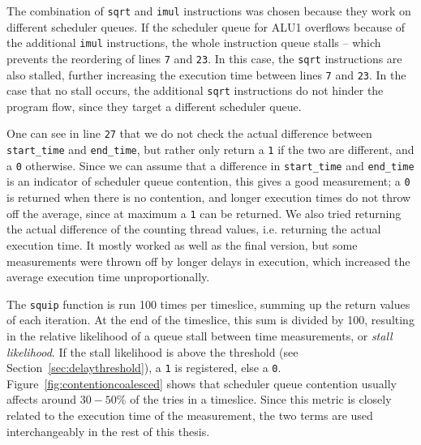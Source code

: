 \documentclass[11pt,
  titlepage=false,
]{scrreprt}
\begin{document}
The combination of \texttt{sqrt} and \texttt{imul} instructions was chosen because they work on different scheduler queues.
If the scheduler queue for ALU1 overflows because of the additional \texttt{imul} instructions,
the whole instruction queue stalls -- which prevents the reordering of lines \texttt{7} and \texttt{23}.
In this case, the \texttt{sqrt} instructions are also stalled, further increasing the execution time between lines \texttt{7} and \texttt{23}.
In the case that no stall occurs, the additional \texttt{sqrt} instructions do not hinder the program flow,
since they target a different scheduler queue.

One can see in line \texttt{27} that we do not check the actual difference between \texttt{start\_time} and \texttt{end\_time},
but rather only return a \texttt{1} if the two are different, and a \texttt{0} otherwise.
Since we can assume that a difference in \texttt{start\_time} and \texttt{end\_time} is an indicator of scheduler queue contention,
this gives a good measurement;
a \texttt{0} is returned when there is no contention, and longer execution times do not throw off the average,
since at maximum a \texttt{1} can be returned.
We also tried returning the actual difference of the counting thread values, i.e. returning the actual execution time.
It mostly worked as well as the final version, but some measurements were thrown off by longer delays in execution,
which increased the average execution time unproportionally.

The \texttt{squip} function is run 100 times per timeslice, summing up the return values of each iteration.
At the end of the timeslice, this sum is divided by 100,
resulting in the relative likelihood of a queue stall between time measurements, or \textit{stall likelihood}.
If the stall likelihood is above the threshold (see Section~\ref{sec:delaythreshold}), a \texttt{1} is registered, else a \texttt{0}.
Figure~\ref{fig:contentioncoalesced} shows that scheduler queue contention usually affects around $30-50\%$ of the tries in a timeslice.
Since this metric is closely related to the execution time of the measurement, the two terms are used interchangeably in the rest of this thesis.


\pagebreak
\end{document}
